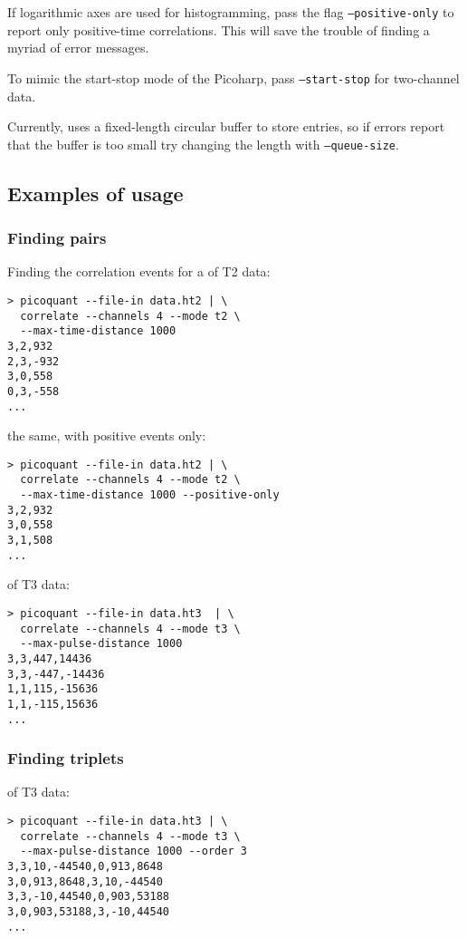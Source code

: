 If logarithmic axes are used for histogramming, pass the flag \texttt{--positive-only} to report only positive-time correlations. This will save the trouble of finding a myriad of error messages.

To mimic the start-stop mode of the Picoharp, pass \texttt{--start-stop} for two-channel data.

Currently,  uses a fixed-length circular buffer to store entries, so if errors report that the buffer is too small try changing the length with \texttt{--queue-size}.

\subsection{Examples of usage}
\subsubsection{Finding  pairs}
Finding the correlation events for a  of T2 data:
\begin{verbatim}
> picoquant --file-in data.ht2 | \
  correlate --channels 4 --mode t2 \
  --max-time-distance 1000
3,2,932
2,3,-932
3,0,558
0,3,-558
...
\end{verbatim}
the same, with positive events only:
\begin{verbatim}
> picoquant --file-in data.ht2 | \
  correlate --channels 4 --mode t2 \
  --max-time-distance 1000 --positive-only
3,2,932                                                                         
3,0,558                                                                         
3,1,508
...
\end{verbatim}
\gn{2} of T3 data:
\begin{verbatim}
> picoquant --file-in data.ht3  | \
  correlate --channels 4 --mode t3 \
  --max-pulse-distance 1000
3,3,447,14436
3,3,-447,-14436
1,1,115,-15636
1,1,-115,15636
...
\end{verbatim}
\subsubsection{Finding  triplets}
\gn{3} of T3 data:
\begin{verbatim}
> picoquant --file-in data.ht3 | \
  correlate --channels 4 --mode t3 \
  --max-pulse-distance 1000 --order 3
3,3,10,-44540,0,913,8648
3,0,913,8648,3,10,-44540
3,3,-10,44540,0,903,53188
3,0,903,53188,3,-10,44540
...
\end{verbatim}


